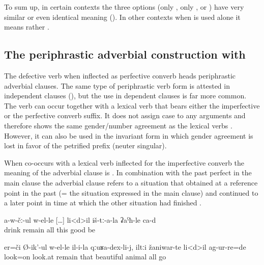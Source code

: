To sum up, in certain contexts the three options (only , only , or ) have very similar or even identical meaning (). In other contexts when  is used alone it means rather .



\subsection{The periphrastic adverbial construction with  }
\label{sec:periphrastic adverbial construction belle}

The defective verb   when inflected as perfective converb heads periphrastic adverbial clauses. The same type of periphrastic verb form is attested in independent clauses (), but the use in dependent clauses is far more common. The verb can occur together with a lexical verb that bears either the imperfective or the perfective converb suffix. It does not assign case to any arguments and therefore shows the same gender/number agreement as the lexical verbs . However, it can also be used in the invariant form   in which gender agreement is lost in favor of the petrified prefix  (neuter singular).

When  co-occurs with a lexical verb inflected for the imperfective converb the meaning of the adverbial clause is  . In combination with the past perfect in the main clause the adverbial clause refers to a situation that obtained at a reference point in the past (= the situation expressed in the main clause) and continued to a later point in time at which the other situation had finished .
%
\begin{exe}
	\ex	\label{ex:‎While until / as long as he is not drinking, everything is good for them}
	\gll	a-w-čː-ul	w-el-le	[\ldots]	li<d>il	iš-tː-a-la	ʡaˁħ-le	ca-d\\
		drink	remain	{}	all	this	good	be\\
	\glt	{}

	\ex	\label{ex:‎‎‎The poor man took the stone}
	\gll	er=či	Ø-ik'-ul	w-el-le	il-i-la	qːuʁa-dex-li-j,	iltːi	žaniwar-te	li<d>il	ag-ur-re=de\\
		look=on	look.at	remain	that	beautiful		animal	all	go\\
	\glt	{}
\end{exe}

